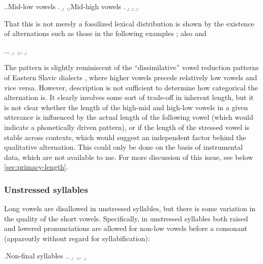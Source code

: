 \ex.\label{ex:mid-vowel-dissimilation}\a.Mid-low vowels
\a.
\b.
\z.\b.Mid-high vowels
\a.
\b.
\b.
\b.

That this is not merely a fossilized lexical distribution is shown by the existence of alternations such as those in the following examples \citep[p.~17]{awbery86:_pembr_welsh}; \cf also \citet[p.~122--123]{wmffre03:_languag_wales} and \citet[p.~131]{thomas89:_cymraeg_cymra_cymre}

\ex.\a.\a.
\b.
\z.\b.\a.
\b.

The pattern is slightly reminiscent of the \enquote{dissimilative} vowel reduction patterns of Eastern Slavic dialects \citep{vaitovich1968nenatsiskny,crosswhite,nesset-reduction,bethin2006,kniazev-shaulski-icphs}, where higher vowels precede relatively low vowels and vice versa. However,  description is not sufficient to determine how categorical the alternation is. It clearly involves some sort of trade-off in inherent length, but it is not clear whether the length of the high-mid and high-low vowels in a given utterance is influenced by the actual length of the following vowel (which would indicate a phonetically driven pattern), or if the length of the stressed vowel is stable across contexts, which would suggest an independent factor behind the qualitative alternation. This could only be done on the basis of instrumental data, which are not available to me. For more discussion of this issue, see below \cref{sec:primacy-length}.

\subsubsection{Unstressed syllables}
\label{sec:unstressed-syllables}

Long vowels are disallowed in unstressed syllables, but there is some variation in the quality of the short vowels. Specifically, in unstressed syllables both raised and lowered pronunciations are allowed for non-low vowels before a consonant (apparently without regard for syllabification):

\ex.Non-final syllables
\a.\a.
\b.
\z.\b.\a.
\b.

